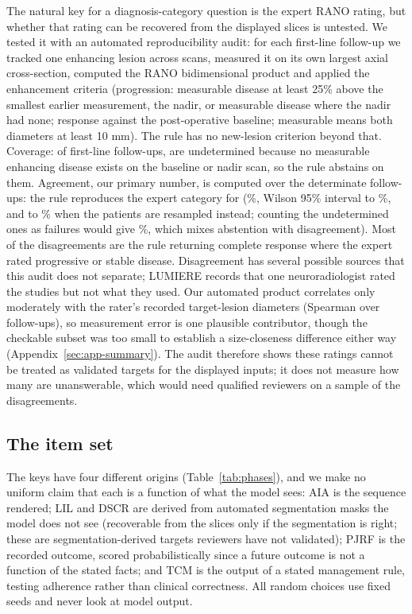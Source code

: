 \documentclass[11pt]{article}
\begin{document}
The natural key for a diagnosis-category question is the expert RANO rating, but whether that rating can be recovered from the displayed slices is untested. We tested it with an automated reproducibility audit: for each first-line follow-up we tracked one enhancing lesion across scans, measured it on its own largest axial cross-section, computed the RANO bidimensional product and applied the enhancement criteria (progression: measurable disease at least 25\% above the smallest earlier measurement, the nadir, or measurable disease where the nadir had none; response against the post-operative baseline; measurable means both diameters at least 10 mm). The rule has no new-lesion criterion beyond that. Coverage: of \vfourFollowups{} first-line follow-ups, \vfourUndetermined{} are undetermined because no measurable enhancing disease exists on the baseline or nadir scan, so the rule abstains on them. Agreement, our primary number, is computed over the \vfourDeterminate{} determinate follow-ups: the rule reproduces the expert category for \vfourConcordant{} (\vfourConcordantDetPct{}\%, Wilson 95\% interval \vfourConcordantDetLo{} to \vfourConcordantDetHi{}\%, and \vfourAuditClusterLo{} to \vfourAuditClusterHi{}\% when the \vfourAuditPatients{} patients are resampled instead; counting the undetermined ones as failures would give \vfourConcordantPct{}\%, which mixes abstention with disagreement). Most of the \vfourDisagree{} disagreements are the rule returning complete response where the expert rated progressive or stable disease. Disagreement has several possible sources that this audit does not separate; LUMIERE records that one neuroradiologist rated the studies but not what they used. Our automated product correlates only moderately with the rater's recorded target-lesion diameters (Spearman \vfourBpRho{} over \vfourBpN{} follow-ups), so measurement error is one plausible contributor, though the checkable subset was too small to establish a size-closeness difference either way (Appendix~\ref{sec:app-summary}). The audit therefore shows these ratings cannot be treated as validated targets for the displayed inputs; it does not measure how many are unanswerable, which would need qualified reviewers on a sample of the disagreements.

\subsection{The item set}
\label{sec:v4}

The keys have four different origins (Table~\ref{tab:phases}), and we make no uniform claim that each is a function of what the model sees: AIA is the sequence rendered; LIL and DSCR are derived from automated segmentation masks the model does not see (recoverable from the slices only if the segmentation is right; these are segmentation-derived targets reviewers have not validated); PJRF is the recorded outcome, scored probabilistically since a future outcome is not a function of the stated facts; and TCM is the output of a stated management rule, testing adherence rather than clinical correctness. All random choices use fixed seeds and never look at model output.
\end{document}
